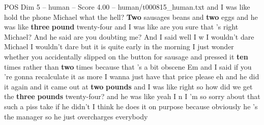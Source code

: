 \begin{textsample}{POS Dim 5 – human – Score 4.00 – human/t000815\_human.txt}  \label{ex:f5_pos_011}
and I was like hold the phone Michael what the hell? \textbf{Two} sausages beans and \textbf{two} eggs and he was like \textbf{three} \textbf{pound} twenty-four and I was like are you sure that 's right Michael?
And he said are you doubting me?
And I said well I w I wouldn't dare Michael I wouldn't dare but it is quite early in the morning I just wonder whether you accidentally slipped on the button for sausage and pressed it \textbf{ten} times rather than \textbf{two} times because that 's a bit obscene Em and I said if you 're gonna recalculate it as more I wanna just have that price please eh and he did it again and it came out at \textbf{two} \textbf{pounds} and I was like right so how did we get the \textbf{three} \textbf{pounds} twenty-four? and he was like yeah I n I 'm so sorry about that such a piss take if he didn't I think he does it on purpose because obviously he 's the manager so he just overcharges everybody

\end{textsample}
